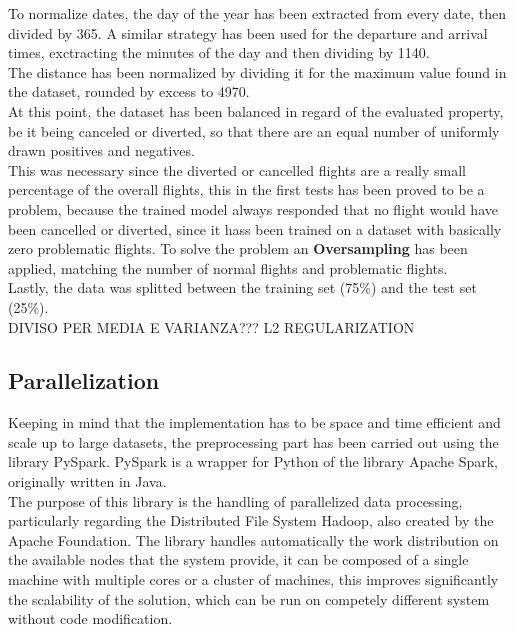\documentclass[
	letterpaper, %
	10pt, %
]{class}
\begin{document}
To normalize dates, the day of the year has been extracted from every date, then divided by 365. A similar strategy has been used for the departure and arrival times, exctracting the minutes of the day and then dividing by 1140.\\

The distance has been normalized by dividing it for the maximum value found in the dataset, rounded by excess to 4970.\\

At this point, the dataset has been balanced in regard of the evaluated property, be it being canceled or diverted, so that there are an equal number of uniformly drawn positives and negatives.\\

This was necessary since the diverted or cancelled flights are a really small percentage of the overall flights,
this in the first tests has been proved to be a problem, because the trained model always responded that no flight would have been cancelled or diverted, since it hass been trained on a dataset with basically zero problematic flights.
To solve the problem an \textbf{Oversampling} has been applied, matching the number of normal flights and problematic flights.\\

Lastly, the data was splitted between the training set (75\%) and the test set (25\%).\\

DIVISO PER MEDIA E VARIANZA??? L2 REGULARIZATION

\subsection{Parallelization}

Keeping in mind that the implementation has to be space and time efficient and scale up to large datasets, the preprocessing part has been carried out using the library PySpark.
PySpark is a wrapper for Python of the library Apache Spark, originally written in Java.\\

The purpose of this library is the handling of parallelized data processing, particularly regarding the Distributed File System Hadoop, also created by the Apache Foundation.
The library handles automatically the work distribution on the available nodes that the system provide, it can be composed of a single machine with multiple cores or a cluster of machines, this improves significantly the scalability of the solution, which can be run on competely different system without code modification.\\
\end{document}
